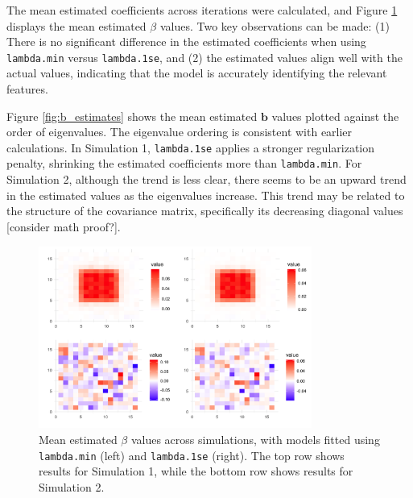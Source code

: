 \documentclass[12pt]{article}
\begin{document}
The mean estimated coefficients across iterations were calculated, and Figure \ref{fig:beta_estimates} displays the mean estimated \( \beta \) values. Two key observations can be made: (1) There is no significant difference in the estimated coefficients when using \texttt{lambda.min} versus \texttt{lambda.1se}, and (2) the estimated values align well with the actual values, indicating that the model is accurately identifying the relevant features.

Figure \ref{fig:b_estimates} shows the mean estimated \( \mathbf{b} \) values plotted against the order of eigenvalues. The eigenvalue ordering is consistent with earlier calculations. In Simulation 1, \texttt{lambda.1se} applies a stronger regularization penalty, shrinking the estimated coefficients more than \texttt{lambda.min}. For Simulation 2, although the trend is less clear, there seems to be an upward trend in the estimated values as the eigenvalues increase. This trend may be related to the structure of the covariance matrix, specifically its decreasing diagonal values [consider math proof?].

\begin{figure}[h!]
	\centering
	\includegraphics[width=0.8\textwidth]{beta_estimates.png}
	\caption{Mean estimated \( \beta \) values across simulations, with models fitted using \texttt{lambda.min} (left) and
		\texttt{lambda.1se} (right). The top row shows results for Simulation 1, while the bottom row shows results for Simulation 2.}
	\label{fig:beta_estimates}
\end{figure}
\end{document}

